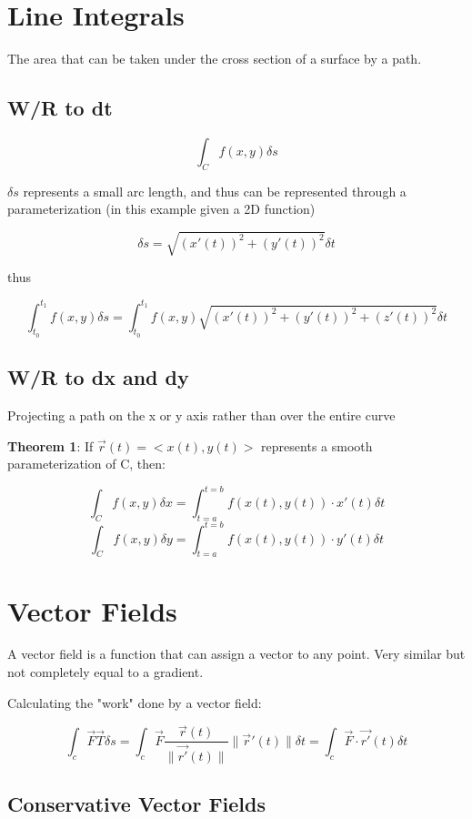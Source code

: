 \documentclass{article}
\begin{document}
\section{Line Integrals}

The area that can be taken under the cross section of a surface by a path.

\subsection{W/R to dt}

$$\int_C f(x, y) \delta s$$

$\delta s$ represents a small arc length, and thus can be represented through a parameterization (in this example given a 2D function)

$$\delta s = \sqrt{(x'(t))^2 + (y'(t))^2} \delta t$$

thus

$$\int_{t_0}^{t_1} f(x, y) \delta s = \int_{t_0}^{t_1} f(x, y) \sqrt{(x'(t)) ^2 + (y'(t))^2 + (z'(t))^2} \delta t$$

\subsection{W/R to dx and dy}

Projecting a path on the x or y axis rather than over the entire curve

\textbf{Theorem 1}: If $\vec{r}(t) = <x(t), y(t)>$ represents a smooth parameterization of C, then:

$$\int_C f(x, y) \delta x = \int_{t = a}^{t = b} f(x(t), y(t)) \cdot x'(t) \delta t$$
$$\int_C f(x, y) \delta y = \int_{t = a}^{t = b} f(x(t), y(t)) \cdot y'(t) \delta t$$


\section{Vector Fields}

A vector field is a function that can assign a vector to any point. Very similar but not completely equal to a gradient.

Calculating the "work" done by a vector field:

$$\int_c \vec{F} \vec{T} \delta s = \int_c \vec{F} \frac{\vec{r}(t)}{\|\vec{r'}(t)\|} \|\vec{ r}'(t) \| \delta t = \int_c \vec{F} \cdot \vec{r'}(t) \delta t$$


\subsection{Conservative Vector Fields}
\end{document}
